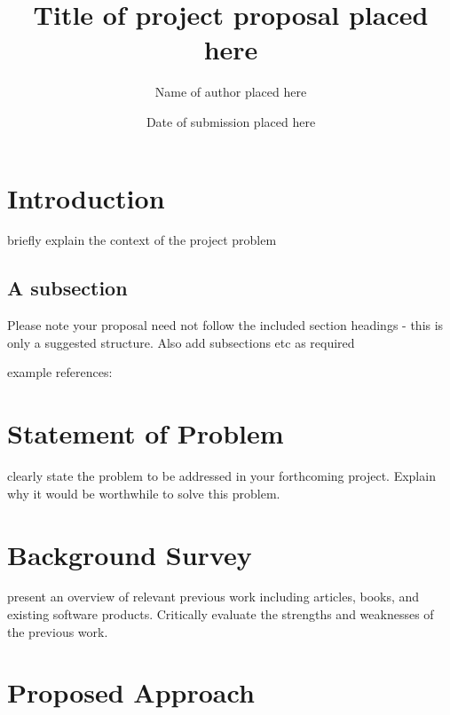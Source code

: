 \documentclass{mprop}
\begin{document}
\title{Title of project proposal placed here}
\author{Name of author placed here}
\date{Date of submission placed here}
\maketitle

\tableofcontents
\newpage

\section{Introduction}\label{intro}

briefly explain the context of the project problem

\subsection{A subsection}
Please note your proposal need not follow the included section headings - this is only a suggested structure. Also add subsections etc as required

example references: \cite{BK08}

\section{Statement of Problem}

clearly state the problem to be addressed in your forthcoming project. Explain why it would be worthwhile to solve this problem.

\section{Background Survey}

present an overview of relevant previous work including articles, books, and existing software products. Critically evaluate the strengths and weaknesses of the previous work.

\section{Proposed Approach}
\end{document}
